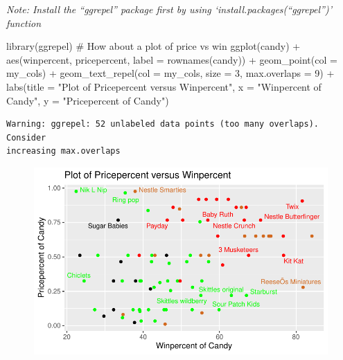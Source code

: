 \documentclass[
  letterpaper,
  DIV=11,
  numbers=noendperiod]{scrartcl}
\newenvironment{Shaded}{\begin{snugshade}}{\end{snugshade}}
\newcommand{\AttributeTok}[1]{\textcolor[rgb]{0.40,0.45,0.13}{#1}}
\newcommand{\CommentTok}[1]{\textcolor[rgb]{0.37,0.37,0.37}{#1}}
\newcommand{\DecValTok}[1]{\textcolor[rgb]{0.68,0.00,0.00}{#1}}
\newcommand{\FunctionTok}[1]{\textcolor[rgb]{0.28,0.35,0.67}{#1}}
\newcommand{\NormalTok}[1]{\textcolor[rgb]{0.00,0.23,0.31}{#1}}
\newcommand{\SpecialCharTok}[1]{\textcolor[rgb]{0.37,0.37,0.37}{#1}}
\newcommand{\StringTok}[1]{\textcolor[rgb]{0.13,0.47,0.30}{#1}}
\begin{document}
\emph{Note: Install the ``ggrepel'' package first by using
`install.packages(``ggrepel'')' function}

\begin{Shaded}
\begin{Highlighting}[]
\FunctionTok{library}\NormalTok{(ggrepel)}
\CommentTok{\# How about a plot of price vs win}
\FunctionTok{ggplot}\NormalTok{(candy) }\SpecialCharTok{+}
  \FunctionTok{aes}\NormalTok{(winpercent, pricepercent, }\AttributeTok{label =} \FunctionTok{rownames}\NormalTok{(candy)) }\SpecialCharTok{+}
  \FunctionTok{geom\_point}\NormalTok{(}\AttributeTok{col =}\NormalTok{ my\_cols) }\SpecialCharTok{+} 
  \FunctionTok{geom\_text\_repel}\NormalTok{(}\AttributeTok{col =}\NormalTok{ my\_cols, }\AttributeTok{size =} \DecValTok{3}\NormalTok{, }\AttributeTok{max.overlaps =} \DecValTok{9}\NormalTok{) }\SpecialCharTok{+}
  \FunctionTok{labs}\NormalTok{(}\AttributeTok{title =} \StringTok{"Plot of Pricepercent versus Winpercent"}\NormalTok{, }
       \AttributeTok{x =} \StringTok{"Winpercent of Candy"}\NormalTok{, }\AttributeTok{y =} \StringTok{"Pricepercent of Candy"}\NormalTok{)}
\end{Highlighting}
\end{Shaded}

\begin{verbatim}
Warning: ggrepel: 52 unlabeled data points (too many overlaps). Consider
increasing max.overlaps
\end{verbatim}

\begin{figure}[H]

{\centering \includegraphics{class10_files/figure-pdf/unnamed-chunk-22-1.pdf}

}

\end{figure}
\end{document}
